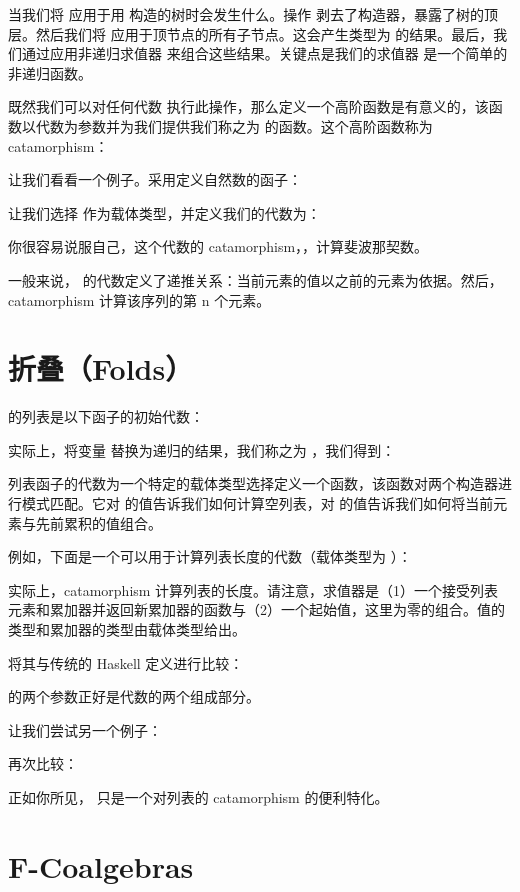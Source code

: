 当我们将  应用于用  构造的树时会发生什么。操作  剥去了构造器，暴露了树的顶层。然后我们将  应用于顶节点的所有子节点。这会产生类型为  的结果。最后，我们通过应用非递归求值器  来组合这些结果。关键点是我们的求值器  是一个简单的非递归函数。

既然我们可以对任何代数  执行此操作，那么定义一个高阶函数是有意义的，该函数以代数为参数并为我们提供我们称之为  的函数。这个高阶函数称为 catamorphism：

让我们看看一个例子。采用定义自然数的函子：

让我们选择  作为载体类型，并定义我们的代数为：

你很容易说服自己，这个代数的 catamorphism，，计算斐波那契数。

一般来说， 的代数定义了递推关系：当前元素的值以之前的元素为依据。然后，catamorphism 计算该序列的第 n 个元素。

\section{折叠（Folds）}

 的列表是以下函子的初始代数：

实际上，将变量  替换为递归的结果，我们称之为 ，我们得到：

列表函子的代数为一个特定的载体类型选择定义一个函数，该函数对两个构造器进行模式匹配。它对  的值告诉我们如何计算空列表，对  的值告诉我们如何将当前元素与先前累积的值组合。

例如，下面是一个可以用于计算列表长度的代数（载体类型为 ）：

实际上，catamorphism  计算列表的长度。请注意，求值器是（1）一个接受列表元素和累加器并返回新累加器的函数与（2）一个起始值，这里为零的组合。值的类型和累加器的类型由载体类型给出。

将其与传统的 Haskell 定义进行比较：

 的两个参数正好是代数的两个组成部分。

让我们尝试另一个例子：

再次比较：

正如你所见， 只是一个对列表的 catamorphism 的便利特化。

\section{F-Coalgebras}

